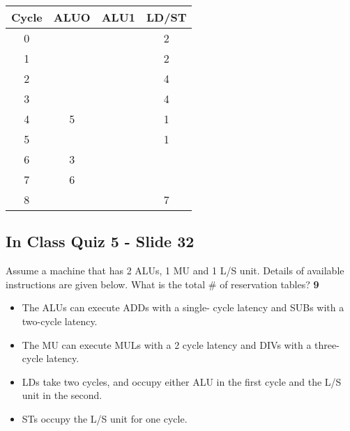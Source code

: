 \documentclass{report}
\begin{document}
\begin{multicols}{3}
\begin{tabular}{|c|c|c|c|}
  \hline
  Cycle & ALUO & ALU1 & LD/ST \\
  \hline
  0     &      &      & 2     \\
  \hline
  1     &      &      & 2     \\
  \hline
  2     &      &      & 4     \\
  \hline
  3     &      &      & 4     \\
  \hline
  4     & 5    &      & 1     \\
  \hline
  5     &      &      & 1     \\
  \hline
  6     & 3    &      &       \\
  \hline
  7     & 6    &      &       \\
  \hline
  8     &      &      & 7     \\
  \hline
\end{tabular}
\end{multicols}


\subsection{In Class Quiz 5 - Slide 32}
Assume a machine that has 2 ALUs, 1 MU and 1 L/S unit. Details of available instructions are given below. What is the total \# of reservation tables? \textbf{9}
\begin{itemize}
 \item The ALUs can execute ADDs with a single-
cycle latency and SUBs with a two-cycle
latency.
 \item The MU can execute MULs with a 2 cycle
latency and DIVs with a three-cycle latency.
 \item LDs take two cycles, and occupy either ALU
in the first cycle and the L/S unit in the
second.
 \item STs occupy the L/S unit for one cycle.
\end{itemize}
\end{document}
